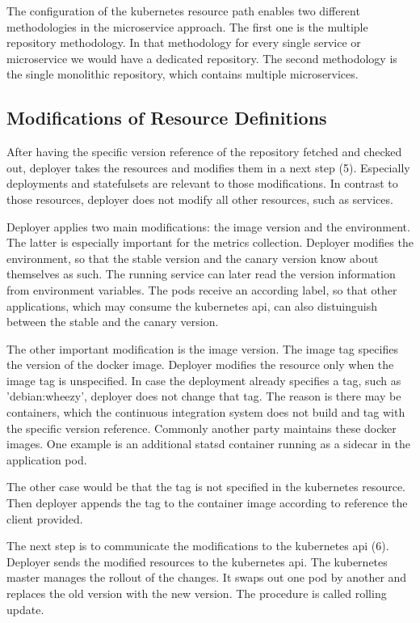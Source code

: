 The configuration of the kubernetes resource path enables two different methodologies in
the microservice approach. The first one is the multiple repository methodology. In that
methodology for every single service or microservice we would have a dedicated repository.
The second methodology is the single monolithic repository, which contains multiple
microservices.

\subsection{Modifications of Resource Definitions}

After having the specific version reference of the repository fetched and checked out,
deployer takes the resources and modifies them in a next step (5). Especially deployments
and statefulsets are relevant to those modifications. In contrast to those resources,
deployer does not modify all other resources, such as services.

Deployer applies two main modifications: the image version and the environment. The latter
is especially important for the metrics collection. Deployer modifies the environment, so
that the stable version and the canary version know about themselves as such. The running
service can later read the version information from environment variables. The pods
receive an according label, so that other applications, which may consume the kubernetes
api, can also distuinguish between the stable and the canary version.

The other important modification is the image version. The image tag specifies the version
of the docker image. Deployer modifies the resource only when the image tag is
unspecified. In case the deployment already specifies a tag, such as 'debian:wheezy',
deployer does not change that tag. The reason is there may be containers, which the
continuous integration system does not build and tag with the specific version
reference. Commonly another party maintains these docker images. One example is an
additional statsd container running as a sidecar in the application pod.

The other case would be that the tag is not specified in the kubernetes resource. Then
deployer appends the tag to the container image according to reference the client provided.

The next step is to communicate the modifications to the kubernetes api (6). Deployer
sends the modified resources to the kubernetes api. The kubernetes master manages the
rollout of the changes. It swaps out one pod by another and replaces the old version with
the new version. The procedure is called rolling update.

